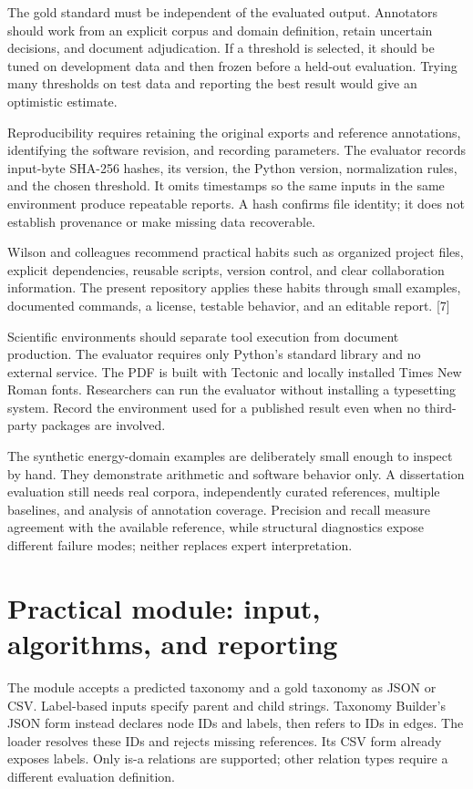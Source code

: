 \documentclass[12pt,a4paper]{article}
\newcommand{\source}[1]{\textnormal{[#1]}}
\begin{document}
The gold standard must be independent of the evaluated output. Annotators should work from an explicit corpus and domain definition, retain uncertain decisions, and document adjudication. If a threshold is selected, it should be tuned on development data and then frozen before a held-out evaluation. Trying many thresholds on test data and reporting the best result would give an optimistic estimate.

Reproducibility requires retaining the original exports and reference annotations, identifying the software revision, and recording parameters. The evaluator records input-byte SHA-256 hashes, its version, the Python version, normalization rules, and the chosen threshold. It omits timestamps so the same inputs in the same environment produce repeatable reports. A hash confirms file identity; it does not establish provenance or make missing data recoverable.

Wilson and colleagues recommend practical habits such as organized project files, explicit dependencies, reusable scripts, version control, and clear collaboration information. The present repository applies these habits through small examples, documented commands, a license, testable behavior, and an editable report. \source{7}

Scientific environments should separate tool execution from document production. The evaluator requires only Python's standard library and no external service. The PDF is built with Tectonic and locally installed Times New Roman fonts. Researchers can run the evaluator without installing a typesetting system. Record the environment used for a published result even when no third-party packages are involved.

The synthetic energy-domain examples are deliberately small enough to inspect by hand. They demonstrate arithmetic and software behavior only. A dissertation evaluation still needs real corpora, independently curated references, multiple baselines, and analysis of annotation coverage. Precision and recall measure agreement with the available reference, while structural diagnostics expose different failure modes; neither replaces expert interpretation.

\clearpage
\section{Practical module: input, algorithms, and reporting}
The module accepts a predicted taxonomy and a gold taxonomy as JSON or CSV. Label-based inputs specify parent and child strings. Taxonomy Builder's JSON form instead declares node IDs and labels, then refers to IDs in edges. The loader resolves these IDs and rejects missing references. Its CSV form already exposes labels. Only is-a relations are supported; other relation types require a different evaluation definition.
\end{document}
